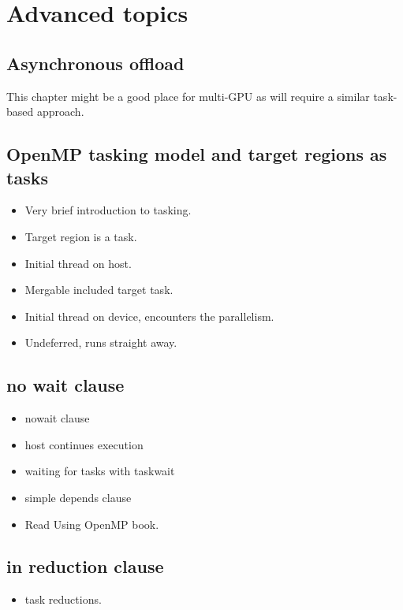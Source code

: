 
\def\ArtDir{06.Advanced/figures}

\chapter{Advanced topics}

\section{Asynchronous offload}
\label{sec:async}

This chapter might be a good place for multi-GPU as will require a similar task-based approach.


\section{OpenMP tasking model and target regions as tasks}
\begin{itemize}
  \item Very brief introduction to tasking.
  \item Target region is a task.
  \item Initial thread on host.
  \item Mergable included target task.
  \item Initial thread on device, encounters the parallelism.
  \item Undeferred, runs straight away.
\end{itemize}

\section{no wait clause}
\begin{itemize}
  \item nowait clause
  \item host continues execution
  \item waiting for tasks with taskwait
  \item simple depends clause
  \item Read Using OpenMP book.
\end{itemize}

\section{in reduction clause}
\label{sec:in_reduction}
\begin{itemize}
  \item task reductions.
\end{itemize}

